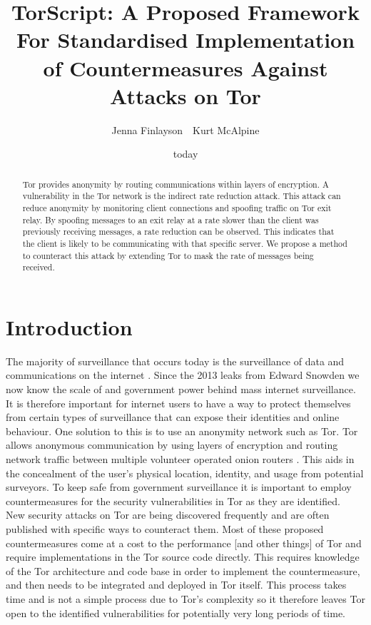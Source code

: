 \documentclass[9pt,technote]{IEEEtran}
\title{TorScript: A Proposed Framework For Standardised Implementation of Countermeasures Against Attacks on Tor}
\date{today}
\author{Jenna Finlayson~~Kurt McAlpine}
\begin{document}
 
\maketitle

\begin{abstract} Tor provides anonymity by routing communications within layers
of encryption. A vulnerability in the Tor network is the indirect rate reduction
attack. This attack can reduce anonymity by monitoring client connections and
spoofing traffic on Tor exit relay. By spoofing messages to an exit relay at a
rate slower than the client was previously receiving messages, a rate reduction
can be observed. This indicates that the client is likely to be communicating
with that specific server. We propose a method to counteract this attack by
extending Tor to mask the rate of messages being received. \end{abstract}

\section{Introduction} 
The majority of surveillance that occurs today is the
surveillance of data and communications on the internet
\cite{diffie2008brave}. Since the 2013 leaks from Edward Snowden we now know the scale of and government power behind mass internet
surveillance. It is therefore important for internet users to have a way to
protect themselves from certain types of surveillance that can expose their identities and online behaviour. One solution to this is to use an anonymity network such as Tor. Tor allows anonymous communication by using layers of encryption and routing network
traffic between multiple volunteer operated onion routers \cite{tor}. This aids in the concealment of the
user's physical location, identity, and usage from potential surveyors. To keep
safe from government surveillance it is important to employ countermeasures for the security
vulnerabilities in Tor as they are identified.\\

New security attacks on Tor are being discovered frequently and are often published with specific ways to counteract them. Most of these proposed countermeasures come at a cost to the performance [and other things] of Tor and require implementations in the Tor source code directly. This requires knowledge of the Tor architecture and code base in order to implement the countermeasure, and then needs to be integrated and deployed in Tor itself. This process takes time and is not a simple process due to Tor's complexity so it therefore leaves Tor open to the identified vulnerabilities for potentially very long periods of time. \\
\end{document}
